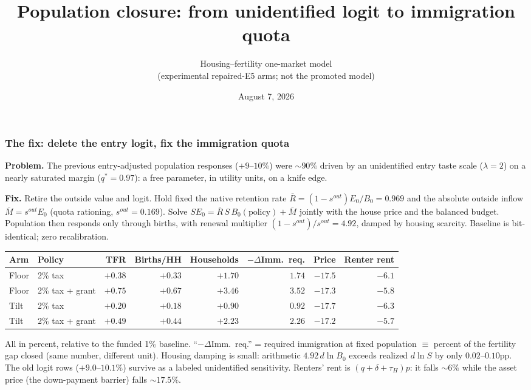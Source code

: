 \documentclass[10pt]{beamer}
\title{Population closure: from unidentified logit to immigration quota}
\author{Housing--fertility one-market model \\ (experimental repaired-E5 arms; not the promoted model)}
\date{August 7, 2026}
\begin{document}
\begin{frame}
\frametitle{The fix: delete the entry logit, fix the immigration quota}
\textbf{Problem.} The previous entry-adjusted population responses ($+9$--$10\%$)
were $\sim 90\%$ driven by an unidentified entry taste scale ($\lambda=2$) on a
nearly saturated margin ($q^*=0.97$): a free parameter, in utility units, on a
knife edge.

\medskip
\textbf{Fix.} Retire the outside value and logit. Hold fixed the native
retention rate $\bar R=(1-s^{out})E_0/B_0=0.969$ and the absolute outside
inflow $\bar M=s^{out}E_0$ (quota rationing, $s^{out}=0.169$). Solve
$S E_0=\bar R\,S\,B_0(\text{policy})+\bar M$ jointly with the house price and
the balanced budget. Population then responds only through births, with
renewal multiplier $(1-s^{out})/s^{out}=4.92$, damped by housing scarcity.
Baseline is bit-identical; zero recalibration.

\medskip
\begin{scriptsize}
\begin{tabular}{llrrrrrr}
\toprule
Arm & Policy & TFR & Births/HH & Households & $-\Delta$Imm.\ req. & Price & Renter rent \\
\midrule
Floor & 2\% tax          & $+0.38$ & $+0.33$ & $+1.70$ & $1.74$ & $-17.5$ & $-6.1$ \\
Floor & 2\% tax + grant  & $+0.75$ & $+0.67$ & $+3.46$ & $3.52$ & $-17.3$ & $-5.8$ \\
Tilt  & 2\% tax          & $+0.20$ & $+0.18$ & $+0.90$ & $0.92$ & $-17.7$ & $-6.3$ \\
Tilt  & 2\% tax + grant  & $+0.49$ & $+0.44$ & $+2.23$ & $2.26$ & $-17.2$ & $-5.7$ \\
\bottomrule
\end{tabular}
\end{scriptsize}

\medskip
\begin{footnotesize}
All in percent, relative to the funded 1\% baseline. ``$-\Delta$Imm.\ req.'' =
required immigration at fixed population $\equiv$ percent of the fertility gap
closed (same number, different unit). Housing damping is small: arithmetic
$4.92\,d\ln B_0$ exceeds realized $d\ln S$ by only $0.02$--$0.10$pp. The old
logit rows ($+9.0$--$10.1\%$) survive as a labeled unidentified sensitivity.
Renters' rent is $(q+\delta+\tau_H)p$: it falls $\sim 6\%$ while the asset
price (the down-payment barrier) falls $\sim 17.5\%$.
\end{footnotesize}
\end{frame}
\end{document}
